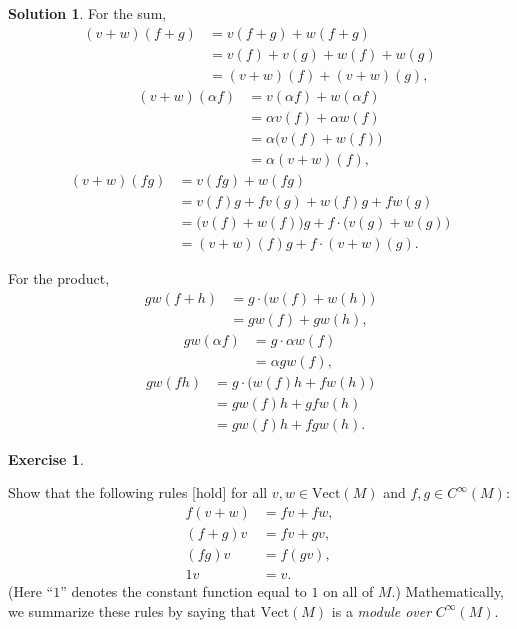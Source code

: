 \documentclass[11pt, a4paper]{report}
\theoremstyle{definition}
\newtheorem{ex}{Exercise}[part]
\newtheorem{sol}{Solution}[part]
\begin{document}
\begin{sol}

For the sum,
\begin{align*}
    (v + w)(f + g) &= v(f + g) + w(f + g) \\
                   &= v(f) + v(g) + w(f) + w(g) \\
                   &= (v + w)(f) + (v + w)(g),
\end{align*}
\begin{align*}
    (v + w)(\alpha f) &= v(\alpha f) + w(\alpha f) \\
                      &= \alpha v(f) + \alpha w(f) \\
                      &= \alpha \bigl(v(f) + w(f)\bigr) \\
                      &= \alpha (v + w)(f),
\end{align*}
\begin{align*}
    (v + w)(fg) &= v(fg) + w(fg) \\
                &= v(f)g + fv(g) + w(f)g + fw(g) \\
                &= \bigl(v(f) + w(f)\bigr)g + f \cdot \bigl(v(g) + w(g)\bigr) \\
                &= (v + w)(f)g + f \cdot (v + w)(g).
\end{align*}

For the product,
\begin{align*}
    gw(f + h) &= g \cdot \bigl(w(f) + w(h)\bigr) \\
              &= gw(f) + gw(h),
\end{align*}
\begin{align*}
    gw(\alpha f) &= g \cdot \alpha w(f) \\
        &= \alpha g w(f),
\end{align*}
\begin{align*}
    gw(fh) &= g \cdot \bigl(w(f)h + f w(h)\bigr) \\
           &= g w(f) h + g f w(h) \\
           &= gw(f) h + fgw(h).
\end{align*}

\end{sol}

\begin{ex}\label{ex:module}

Show that the following rules [hold] for all $v, w \in \text{Vect}(M)$ and $f, g \in C^\infty(M)$:
\begin{align*}
    f(v + w) &= fv + fw, \\
    (f + g)v &= fv + gv, \\
    (fg)v &= f(gv), \\
    1v &= v.
\end{align*}
(Here ``$1$'' denotes the constant function equal to $1$ on all of $M$.) Mathematically, we summarize these rules by saying that $\text{Vect}(M)$ is a \emph{module over} $C^\infty(M)$.

\end{ex}
\end{document}
